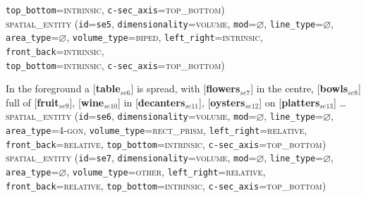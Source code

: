 \documentclass[11pt]{article}
\newcommand{\entity}[2]{[\textbf{\color{darkblue}#1}$_{se#2}$]}
\begin{document}
{            \texttt{top\_bottom}=\textsc{intrinsic},
            \texttt{c-sec\_axis}=\textsc{top\_bottom})\vspace{0.5em}\\
        \textsc{spatial\_entity}
            (\texttt{id}=\texttt{se5},
            \texttt{dimensionality}=\textsc{volume},
            \texttt{mod}=$\varnothing$,
            \texttt{line\_type}=$\varnothing$,\\
            \texttt{area\_type}=$\varnothing$,
            \texttt{volume\_type}=\textsc{biped},
            \texttt{left\_right}=\textsc{intrinsic},
            \texttt{front\_back}=\textsc{intrinsic},\\
            \texttt{top\_bottom}=\textsc{intrinsic},
            \texttt{c-sec\_axis}=\textsc{top\_bottom})        
        \label{ex:maurice_henriette}
    \item In the foreground a \entity{table}{6} is spread, with \entity{flowers}{7} in the centre, \entity{bowls}{8} full of \entity{fruit}{9}, \entity{wine}{10} in \entity{decanters}{11}, \entity{oysters}{12} on \entity{platters}{13} \ldots\vspace{0.5em}\\
        \textsc{spatial\_entity}
            (\texttt{id}=\texttt{se6},
            \texttt{dimensionality}=\textsc{volume},
            \texttt{mod}=$\varnothing$,
            \texttt{line\_type}=$\varnothing$,\\
            \texttt{area\_type}=\textsc{4-gon},
            \texttt{volume\_type}=\textsc{rect\_prism},
            \texttt{left\_right}=\textsc{relative},\\
            \texttt{front\_back}=\textsc{relative},
            \texttt{top\_bottom}=\textsc{intrinsic},
            \texttt{c-sec\_axis}=\textsc{top\_bottom})\vspace{0.5em}\\
        \textsc{spatial\_entity}
            (\texttt{id}=\texttt{se7},
            \texttt{dimensionality}=\textsc{volume},
            \texttt{mod}=$\varnothing$,
            \texttt{line\_type}=$\varnothing$,\\
            \texttt{area\_type}=$\varnothing$,
            \texttt{volume\_type}=\textsc{other},
            \texttt{left\_right}=\textsc{relative},\\
            \texttt{front\_back}=\textsc{relative},
            \texttt{top\_bottom}=\textsc{intrinsic},
            \texttt{c-sec\_axis}=\textsc{top\_bottom})\vspace{0.5em}\\
}
\end{document}
